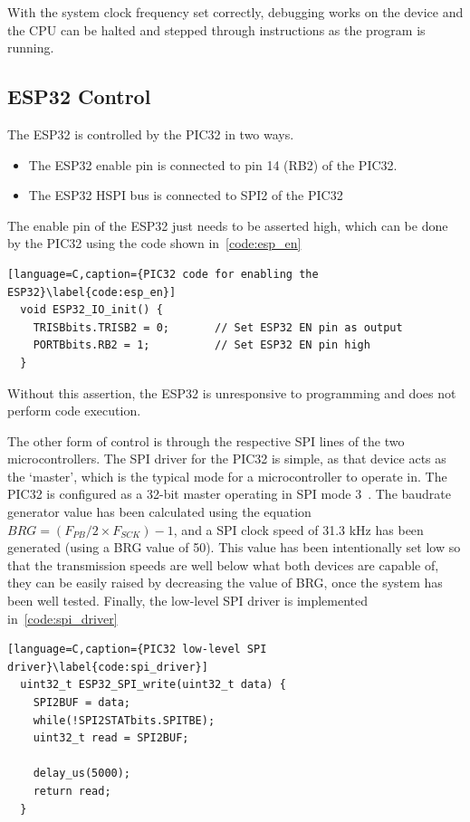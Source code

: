With the system clock frequency set correctly, debugging works on the device and the CPU can be halted and stepped through instructions as the program is running.

\subsection{ESP32 Control}
The ESP32 is controlled by the PIC32 in two ways.

\begin{itemize}
        \item The ESP32 enable pin is connected to pin 14 (RB2) of the PIC32.
        \item The ESP32 HSPI bus is connected to SPI2 of the PIC32
\end{itemize}

The enable pin of the ESP32 just needs to be asserted high, which can be done by the PIC32 using the code shown in~\autoref{code:esp_en}

\begin{lstlisting}[language=C,caption={PIC32 code for enabling the ESP32}\label{code:esp_en}]
  void ESP32_IO_init() {
    TRISBbits.TRISB2 = 0;       // Set ESP32 EN pin as output
    PORTBbits.RB2 = 1;          // Set ESP32 EN pin high
  }
\end{lstlisting}

Without this assertion, the ESP32 is unresponsive to programming and does not perform code execution.

The other form of control is through the respective SPI lines of the two microcontrollers.
The SPI driver for the PIC32 is simple, as that device acts as the `master', which is the typical mode for a microcontroller to operate in.
The PIC32 is configured as a 32-bit master operating in SPI mode 3~\cite{Barry:2012}.
The baudrate generator value has been calculated using the equation \(BRG = (F_{PB} / 2 \times F_{SCK}) - 1\),
and a SPI clock speed of 31.3 kHz has been generated (using a BRG value of 50).
This value has been intentionally set low so that the transmission speeds are well below what both devices are capable of,
they can be easily raised by decreasing the value of BRG, once the system has been well tested.
Finally, the low-level SPI driver is implemented in~\autoref{code:spi_driver}

\begin{lstlisting}[language=C,caption={PIC32 low-level SPI driver}\label{code:spi_driver}]
  uint32_t ESP32_SPI_write(uint32_t data) {
    SPI2BUF = data;
    while(!SPI2STATbits.SPITBE);
    uint32_t read = SPI2BUF;

    delay_us(5000);
    return read;
  }
\end{lstlisting}

